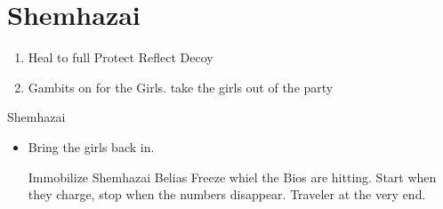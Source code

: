 \chapter{Shemhazai}

\begin{enumerate}
	\item Heal \vaan to full
	      \vaanf Protect \vaan
	      \penelof Reflect \vaan
	      \ashef Decoy \vaan
	\item Gambits on for the Girls. take the girls out of the party
\end{enumerate}
\begin{battle}{Shemhazai}
	\begin{itemize}
		\item Bring the girls back in.
		      \begin{gambit}
			      \begin{itemize}
			      \end{itemize}
		      \end{gambit}
		      \vaanf Immobilize Shemhazai
		      \vaanf Belias Freeze whiel the Bios are hitting. Start when they charge, stop when the numbers disappear.
		      \vaanf Traveler at the very end.
	\end{itemize}
\end{battle}